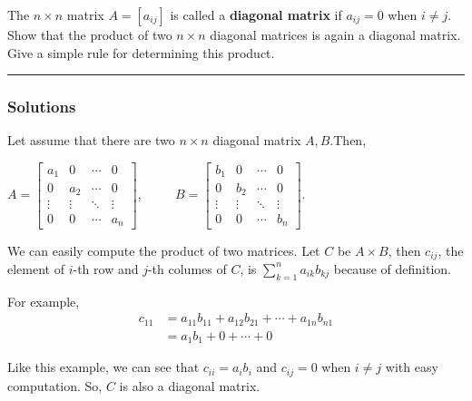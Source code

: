 \newpage
\begin{question}
The $n\times n$ matrix $A = \left [ a_{ij} \right ]$ is called a \textbf{diagonal matrix} if $a_{ij} = 0$ when $i \neq j$. Show that the product of two $n\times n$ diagonal matrices is again a diagonal matrix. Give a simple rule for determining this product.
\end{question}

\par\noindent\rule{\textwidth}{0.5pt}

\subsubsection*{Solutions}

Let assume that there are two $n\times n$ diagonal matrix $A, B$.Then,
\begin{center}
    $\displaystyle A = \begin{bmatrix} a_{1} & 0 & \cdots & 0 \\ 0 & a_{2} & \cdots & 0 \\ \vdots & \vdots & \ddots & \vdots \\ 0 & 0 & \cdots & a_{n} \end{bmatrix}$, $\qquad$ $\displaystyle B = \begin{bmatrix} b_{1} & 0 & \cdots & 0 \\ 0 & b_{2} & \cdots & 0 \\ \vdots & \vdots & \ddots & \vdots \\ 0 & 0 & \cdots & b_{n} \end{bmatrix}$.
\end{center}

\bigskip\noindent
We can easily compute the product of two matrices. Let $C$ be $A\times B$, then $c_{ij}$, the element of $i$-th row and $j$-th columes of $C$, is $\displaystyle \sum_{k=1}^{n} a_{ik}b_{kj}$ because of definition.

\bigskip\noindent
For example,
\begin{align*}
    c_{11} & = a_{11}b_{11} + a_{12}b_{21} + \cdots + a_{1n}b_{n1} \\ 
    & = a_1 b_1 + 0 + \cdots + 0
\end{align*}

\bigskip\noindent
Like this example, we can see that $c_{ii} = a_i b_i$ and $c_{ij} = 0$ when $i \neq j$ with easy computation.
So, $C$ is also a diagonal matrix.
